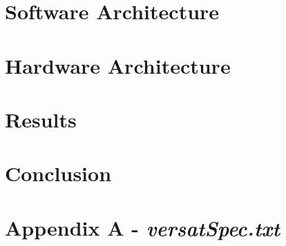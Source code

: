 \documentclass[10pt]{esda}
\begin{document}
\cleardoublepage
\section{Software Architecture}
\label{sec:sw}


\cleardoublepage
\section{Hardware Architecture}
\label{sec:hw}


\cleardoublepage
\section{Results}
\label{sec:results}


\cleardoublepage
\section{Conclusion}
\label{sec:conc}


\cleardoublepage
{}




\cleardoublepage

\section*{Appendix A - \textbf{\textit{versatSpec.txt}}}
\appendix

\end{document}
